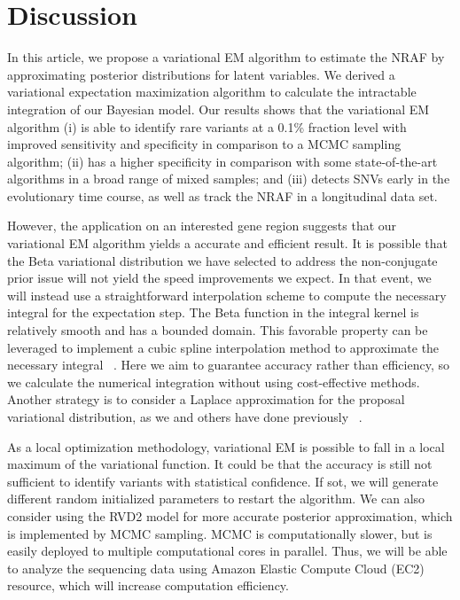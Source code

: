 \documentclass[11pt,reqno]{amsart}
\begin{document}
\section{Discussion}
In this article, we propose a variational EM algorithm to estimate the NRAF by approximating posterior distributions for latent variables.
We derived a variational expectation maximization algorithm to calculate the intractable integration of our Bayesian model.
Our results shows that the variational EM algorithm
(i) is able to identify rare variants at a 0.1\% fraction level with improved sensitivity and specificity in comparison to a MCMC sampling algorithm;
(ii) has a higher specificity in comparison with some state-of-the-art algorithms in a broad range of mixed samples;
and (iii) detects SNVs early in the evolutionary time course, as well as track the NRAF in a longitudinal data set.

However, the application on an interested gene region suggests that our variational EM algorithm yields a accurate and efficient result.
It is possible that the Beta variational distribution we have selected to address the non-conjugate prior issue will not yield the speed improvements we expect.
In that event, we will instead use a straightforward interpolation scheme to compute the necessary integral for the expectation step.
The Beta function in the integral kernel is relatively smooth and has a bounded domain.
This favorable property can be leveraged to implement a cubic spline interpolation method to approximate the necessary integral ~\citep{mckinley1998cubic}.
Here we aim to guarantee accuracy rather than efficiency, so we calculate the numerical integration without using cost-effective methods.
Another strategy is to consider a Laplace approximation for the proposal variational distribution, as we and others have done previously ~\citep{saddiki2014glad, wang2013variational}.

As a local optimization methodology, variational EM is possible to fall in a local maximum of the variational function.
It could be that the accuracy is still not sufficient to identify variants with statistical confidence.
If sot, we will generate different random initialized parameters to restart the algorithm.
We can also consider using the RVD2 model for more accurate posterior approximation, which is implemented by MCMC sampling.
MCMC is computationally slower, but is easily deployed to multiple computational cores in parallel.
Thus, we will be able to analyze the sequencing data using Amazon Elastic Compute Cloud (EC2) resource, which will increase computation efficiency.
\end{document}

